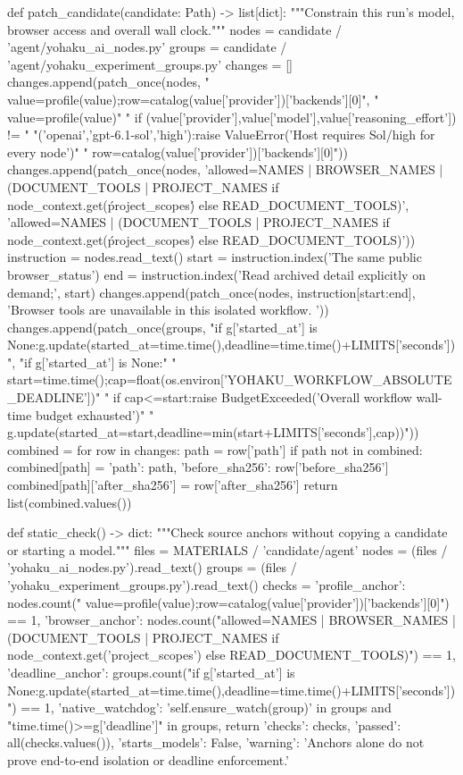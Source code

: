 def patch_candidate(candidate: Path) -> list[dict]:
    """Constrain this run's model, browser access and overall wall clock."""
    nodes = candidate / 'agent/yohaku_ai_nodes.py'
    groups = candidate / 'agent/yohaku_experiment_groups.py'
    changes = []
    changes.append(patch_once(nodes,
        " value=profile(value);row=catalog(value['provider'])['backends'][0]",
        " value=profile(value)\n"
        " if (value['provider'],value['model'],value['reasoning_effort']) != "
        "('openai','gpt-6.1-sol','high'):raise ValueError('Host requires Sol/high for every node')\n"
        " row=catalog(value['provider'])['backends'][0]"))
    changes.append(patch_once(nodes,
        'allowed=NAMES | BROWSER_NAMES | (DOCUMENT_TOOLS | PROJECT_NAMES if node_context.get(\'project_scopes\') else READ_DOCUMENT_TOOLS)',
        'allowed=NAMES | (DOCUMENT_TOOLS | PROJECT_NAMES if node_context.get(\'project_scopes\') else READ_DOCUMENT_TOOLS)'))
    instruction = nodes.read_text()
    start = instruction.index('The same public browser_status')
    end = instruction.index('Read archived detail explicitly on demand;', start)
    changes.append(patch_once(nodes, instruction[start:end],
        'Browser tools are unavailable in this isolated workflow. '))
    changes.append(patch_once(groups,
        "if g['started_at'] is None:g.update(started_at=time.time(),deadline=time.time()+LIMITS['seconds'])",
        "if g['started_at'] is None:\n"
        "     start=time.time();cap=float(os.environ['YOHAKU_WORKFLOW_ABSOLUTE_DEADLINE'])\n"
        "     if cap<=start:raise BudgetExceeded('Overall workflow wall-time budget exhausted')\n"
        "     g.update(started_at=start,deadline=min(start+LIMITS['seconds'],cap))"))
    combined = {}
    for row in changes:
        path = row['path']
        if path not in combined:
            combined[path] = {'path': path, 'before_sha256': row['before_sha256']}
        combined[path]['after_sha256'] = row['after_sha256']
    return list(combined.values())


def static_check() -> dict:
    """Check source anchors without copying a candidate or starting a model."""
    files = MATERIALS / 'candidate/agent'
    nodes = (files / 'yohaku_ai_nodes.py').read_text()
    groups = (files / 'yohaku_experiment_groups.py').read_text()
    checks = {
        'profile_anchor': nodes.count(" value=profile(value);row=catalog(value['provider'])['backends'][0]") == 1,
        'browser_anchor': nodes.count("allowed=NAMES | BROWSER_NAMES | (DOCUMENT_TOOLS | PROJECT_NAMES if node_context.get('project_scopes') else READ_DOCUMENT_TOOLS)") == 1,
        'deadline_anchor': groups.count("if g['started_at'] is None:g.update(started_at=time.time(),deadline=time.time()+LIMITS['seconds'])") == 1,
        'native_watchdog': 'self.ensure_watch(group)' in groups and "time.time()>=g['deadline']" in groups,
    }
    return {'checks': checks, 'passed': all(checks.values()), 'starts_models': False,
            'warning': 'Anchors alone do not prove end-to-end isolation or deadline enforcement.'}


